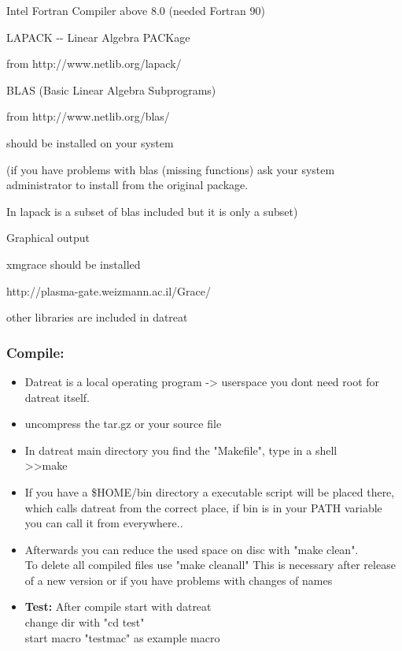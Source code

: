 \documentclass[]{article}
\begin{document}
Intel Fortran Compiler above 8.0 (needed Fortran 90)

LAPACK -\/- Linear Algebra PACKage

from http://www.netlib.org/lapack/

BLAS (Basic Linear Algebra Subprograms)

from http://www.netlib.org/blas/

should be installed on your system

(if you have problems with blas (missing functions) ask your system
administrator to install from the original package.

In lapack is a subset of blas included but it is only a subset)

Graphical output

xmgrace should be installed

http://plasma-gate.weizmann.ac.il/Grace/

other libraries are included in datreat

\hypertarget{compile}{%
\subsubsection{Compile:}\label{compile}}

\begin{itemize}
\item
  Datreat is a local operating program -\textgreater{} userspace you
  dont need root for datreat itself.
\item
  uncompress the tar.gz or your source file
\item
  In datreat main directory you find the "Makefile", type in a shell\\
  \textgreater{}\textgreater{}make
\item
  If you have a \$HOME/bin directory a executable script will be placed
  there, which calls datreat from the correct place, if bin is in your
  PATH variable you can call it from everywhere..
\item
  Afterwards you can reduce the used space on disc with "make clean".\\
  To delete all compiled files use "make cleanall" This is necessary
  after release of a new version or if you have problems with changes of
  names
\item
  \textbf{Test:} After compile start with datreat\\
  change dir with "cd test"\\
  start macro "testmac" as example macro
\end{itemize}
\end{document}
